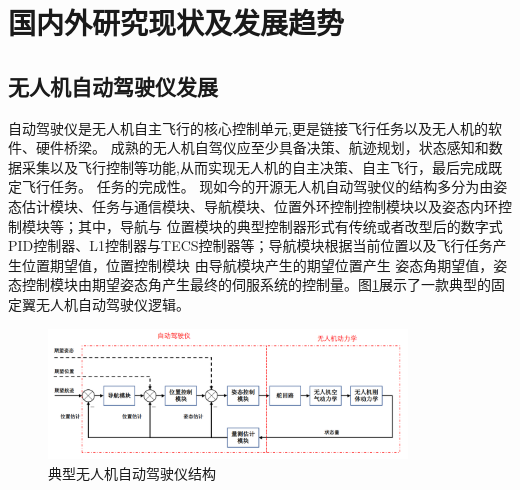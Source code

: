 \section{国内外研究现状及发展趋势}
\subsection{无人机自动驾驶仪发展}
自动驾驶仪是无人机自主飞行的核心控制单元,更是链接飞行任务以及无人机的软件、硬件桥梁。
成熟的无人机自驾仪应至少具备决策、航迹规划，状态感知和数据采集以及飞行控制等功能,从而实现无人机的自主决策、自主飞行，最后完成既定飞行任务。
任务的完成性。\cite{LiuLi2010}
现如今的开源无人机自动驾驶仪的结构多分为由姿态估计模块、任务与通信模块、导航模块、位置外环控制控制模块以及姿态内环控制模块等；其中，导航与
位置模块的典型控制器形式有传统或者改型后的数字式PID控制器、L1控制器\cite{Park_2004}与TECS控制器等\cite{Lambregts1983Vertical}；导航模块根据当前位置以及飞行任务产生位置期望值，位置控制模块
由导航模块产生的期望位置产生
姿态角期望值，姿态控制模块由期望姿态角产生最终的伺服系统的控制量。图\ref{fig-c1-autopilot}展示了一款典型的固定翼无人机自动驾驶仪逻辑。
\begin{figure}[H]
    \centering
    \includegraphics[width=0.85\textwidth]{figures/c1/autopilot_struct}
    \caption{典型无人机自动驾驶仪结构}\label{fig-c1-autopilot}
\end{figure}
